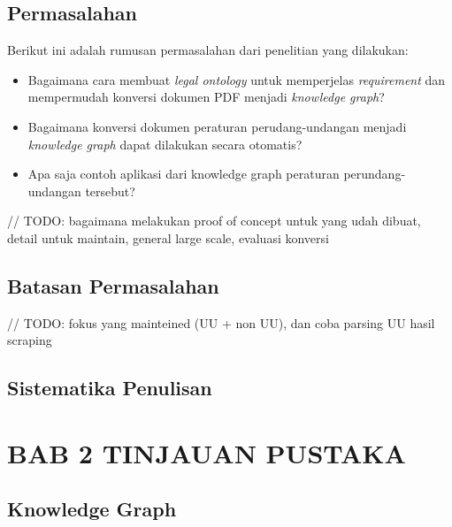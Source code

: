 \subsection{Permasalahan}\label{permasalahan}

Berikut ini adalah rumusan permasalahan dari penelitian yang dilakukan:

\begin{itemize}
\itemsep1pt\parskip0pt
\item
  Bagaimana cara membuat \emph{legal ontology} untuk memperjelas
  \emph{requirement} dan mempermudah konversi dokumen PDF menjadi
  \emph{knowledge graph}?
\item
  Bagaimana konversi dokumen peraturan perudang-undangan menjadi
  \emph{knowledge graph} dapat dilakukan secara otomatis?
\item
  Apa saja contoh aplikasi dari knowledge graph peraturan
  perundang-undangan tersebut?
\end{itemize}

// TODO: bagaimana melakukan proof of concept untuk yang udah dibuat,
detail untuk maintain, general large scale, evaluasi konversi

\subsection{Batasan Permasalahan}\label{batasan-permasalahan}

// TODO: fokus yang mainteined (UU + non UU), dan coba parsing UU hasil
scraping

\subsection{Sistematika Penulisan}\label{sistematika-penulisan}

\section{BAB 2 TINJAUAN PUSTAKA}\label{bab-2-tinjauan-pustaka}

\subsection{Knowledge Graph}\label{knowledge-graph}

